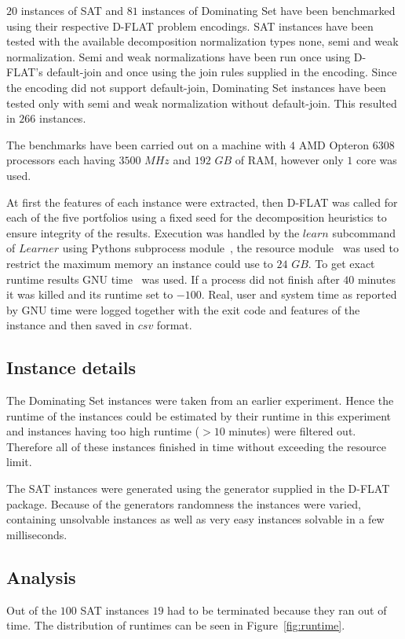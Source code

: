 $20$ instances of SAT and $81$ instances of Dominating Set have been benchmarked using their respective \mbox{D-FLAT} problem encodings. SAT instances have been tested with the available decomposition normalization types none, semi and weak normalization. Semi and weak normalizations have been run once using \mbox{D-FLAT}'s default-join and once using the join rules supplied in the encoding. 
Since the encoding did not support default-join, Dominating Set instances have been tested only with semi and weak normalization without default-join. This resulted in $266$ instances.

The benchmarks have been carried out on a machine with $4$ AMD Opteron $6308$ processors each having $3500$ $MHz$ and $192$ $GB$ of RAM, however only $1$ core was used.

At first the features of each instance were extracted, then \mbox{D-FLAT} was called for each of the five portfolios using a fixed seed for the decomposition heuristics to ensure integrity of the results.
Execution was handled by the \inline$learn$ subcommand of \inline$Learner$ using Pythons subprocess module~\cite{www:subprocess}, the resource module~\cite{www:resource} was used to restrict the maximum memory an instance could use to $24$ $GB$. To get exact runtime results GNU time~\cite{www:time} was used. If a process did not finish after $40$ minutes it was killed and its runtime set to $-100$. Real, user and system time as reported by GNU time were logged together with the exit code and features of the instance and then saved in \inline$csv$ format.

\subsection{Instance details}
The Dominating Set instances were taken from an earlier experiment. Hence the runtime of the instances could be estimated by their runtime in this experiment and instances having too high runtime ($>10$ minutes) were filtered out. Therefore all of these instances finished in time without exceeding the resource limit.

The SAT instances were generated using the generator supplied in the \mbox{D-FLAT} package. Because of the generators randomness the instances were varied, containing unsolvable instances as well as very easy instances solvable in a few milliseconds.

\subsection{Analysis}
Out of the $100$ SAT instances $19$ had to be terminated because they ran out of time. The distribution of runtimes can be seen in Figure~\ref{fig:runtime}.

